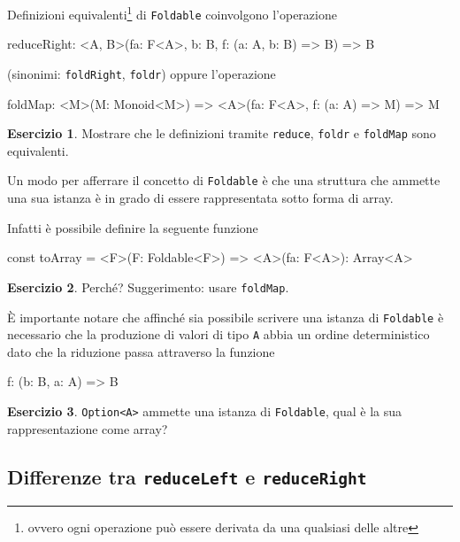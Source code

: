 \documentclass[12pt]{article}
\theoremstyle{definition}
\newtheorem{exercise}{Esercizio}[section]
\newenvironment{code}
  {\vspace{0.5cm} \VerbatimEnvironment\begin{typescriptcode}}
  {\end{typescriptcode} \vspace{0.2cm}}
\begin{document}
Definizioni equivalenti\footnote{ovvero ogni operazione può essere derivata da una qualsiasi delle altre} di \texttt{Foldable}
coinvolgono l'operazione

\begin{code}
reduceRight: <A, B>(fa: F<A>, b: B, f: (a: A, b: B) => B) => B
\end{code}

(sinonimi: \texttt{foldRight}, \texttt{foldr}) oppure l'operazione

\begin{code}
foldMap: <M>(M: Monoid<M>) =>
  <A>(fa: F<A>, f: (a: A) => M) => M
\end{code}

\begin{exercise}
Mostrare che le definizioni tramite \texttt{reduce}, \texttt{foldr} e \texttt{foldMap} sono equivalenti.
\end{exercise}

Un modo per afferrare il concetto di \texttt{Foldable} è che una struttura che ammette una sua istanza
è in grado di essere rappresentata sotto forma di array.

Infatti è possibile definire la seguente funzione

\begin{code}
const toArray = <F>(F: Foldable<F>) => <A>(fa: F<A>): Array<A>
\end{code}

\begin{exercise}
Perché? Suggerimento: usare \texttt{foldMap}.
\end{exercise}

È importante notare che affinché sia possibile scrivere una istanza di \texttt{Foldable} è necessario che la produzione di valori
di tipo \texttt{A} abbia un ordine deterministico dato che la riduzione passa attraverso la funzione

\begin{code}
f: (b: B, a: A) => B
\end{code}

\begin{exercise}
\texttt{Option<A>} ammette una istanza di \texttt{Foldable}, qual è la sua rappresentazione come array?
\end{exercise}

\subsection{Differenze tra \texttt{reduceLeft} e \texttt{reduceRight}}
\end{document}
